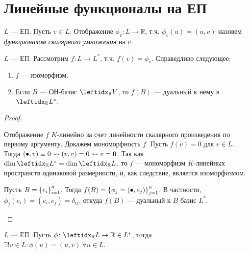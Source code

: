 \section{Линейные функционалы на ЕП}

\begin{defn}
    $L$ --- ЕП. Пусть $v \in L$. Отображение $\phi_v \colon L \to \mathbb{R}$, т.ч. $\phi_v(u) = (u, v)$ назовем \textit{функционалом скалярного умножения} на $v$.
\end{defn}

\begin{thm*}
    $L$ --- ЕП. Рассмотрим $f \colon L \to L^*$, т.ч. $f(v) = \phi_v$. Справедливо следующее:
    \begin{enumerate}
        \item $f$ --- изоморфизм.
        \item Если $B$ --- ОН-базис $\lsub{\mathbb{R}}{V}$, то $f(B)$ --- дуальный к нему в $\lsub{\mathbb{R}}{L^*}$.
    \end{enumerate}
\end{thm*}

\begin{proof}
    \begin{proofpart}
        Отображение $f$ $K$-линейно за счет линейности скалярного произведения по первому аргументу. Докажем мономорфность $f$. Пусть $f(v) = 0$ для $v \in L$. Тогда $(\bullet, v) \equiv 0 \leadsto (v, v) = 0 \leadsto v = \mathbf{0}$. Так как $\dim \lsub{\mathbb{R}}{L^*} = \dim \lsub{\mathbb{R}}{L}$, то $f$ --- мономорфизм $K$-линейных пространств одинаковой размерности, и, как следствие, является изоморфизмом.
    \end{proofpart}
    \begin{proofpart}
        Пусть $B = \left\{e_i\right\}_{i=1}^{n}$. Тогда $f(B) = \left\{\phi_j = (\bullet, e_j)\right\}_{j=1}^{n}$. В частности, $\phi_j(e_i) = (e_i, e_j) = \delta_{ij}$, откуда $f(B)$ --- дуальный к $B$ базис $L^*$.
    \end{proofpart}
\end{proof}

\begin{cor*}
    $L$ --- ЕП. Пусть $\phi \colon \lsub{\mathbb{R}}{L} \to \mathbb{R} \in L^*$, тогда $\exists! v \in L \colon \phi(u) = (u, v)\ \forall u \in L$.
\end{cor*}